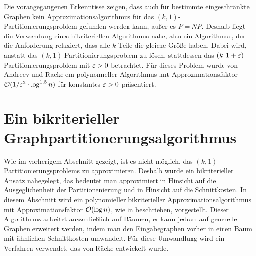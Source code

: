 Die vorangegangenen Erkenntisse zeigen, dass auch für bestimmte eingeschränkte Graphen kein Approximationsalgorithmus für das $(k,1)$\hyp Partitionierungsproblem gefunden werden kann, außer es $P=NP$. 
Deshalb liegt die Verwendung eines bikriteriellen Algorithmus nahe, also ein Algorithmus, der die Anforderung relaxiert, dass alle $k$ Teile die gleiche Größe haben.
Dabei wird, anstatt das $(k,1)$\hyp Partitionierungsproblem zu lösen, stattdessen das $(k,1+\varepsilon)$\hyp Partitionierungsproblem mit $\varepsilon > 0$ betrachtet.
Für dieses Problem wurde von Andreev und Räcke ein polynomieller Algorithmus mit Approximationsfaktor $\mathcal{O}(1/\varepsilon^2 \cdot \log^{1.5} n)$ für konstantes $\varepsilon > 0$ präsentiert. \parencite{ar06} 

\section{Ein bikriterieller Graphpartitionerungsalgorithmus}
Wie im vorherigem Abschnitt gezeigt, ist es nicht möglich, das $(k,1)$\hyp Partitionierungsproblems zu approximieren. 
Deshalb wurde ein bikriterieller Ansatz nahegelegt, das bedeutet man approximiert in Hinsicht auf die Ausgeglichenheit der Partitionenierung und in Hinsicht auf die Schnittkosten.
In diesem Abschnitt wird ein polynomieller bikriterieller Approximationsalgorithmus mit Approximationsfaktor $\mathcal{O}(\log n)$, wie in \parencite{ff13} beschrieben, vorgestellt.
Dieser Algorithmus arbeitet ausschließlich auf Bäumen, er kann jedoch auf generelle Graphen erweitert werden, indem man den Eingabegraphen vorher in einen Baum mit ähnlichen Schnittkosten umwandelt.
Für diese Umwandlung wird ein Verfahren verwendet, das von Räcke entwickelt wurde. \parencite{rc08}

